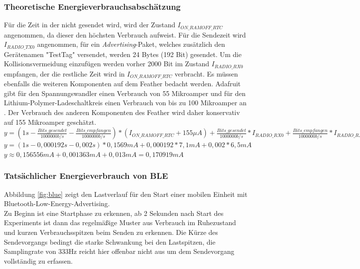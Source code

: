 \subsubsection{Theoretische Energieverbrauchsabschätzung}
Für die Zeit in der nicht gesendet wird, wird der Zustand $I_{ON\_RAMOFF\_RTC}$ angenommen, da dieser den höchsten Verbrauch aufweist.
Für die Sendezeit wird $I_{RADIO\_TX0}$ angenommen, für ein \emph{Advertising}-Paket, welches zusätzlich den Gerätenamen "{}TestTag"{} versendet, werden 24 Bytes (192 Bit) gesendet.
Um die Kollisionsvermeidung einzufügen werden vorher 2000 Bit im Zustand $I_{RADIO\_RX0}$ empfangen, der die restliche Zeit wird in $I_{ON\_RAMOFF\_RTC}$ verbracht. 
Es müssen ebenfalls die weiteren Komponenten auf dem Feather bedacht werden. 
Adafruit gibt für den Spannungswandler einen Verbrauch von 55 Mikroamper und für den Lithium-Polymer-Ladeschaltkreis einen Verbrauch von bis zu 100 Mikroamper an \cite{fried2016lora}. 
Der Verbrauch des anderen Komponenten des Feather wird daher konservativ auf 155 Mikroamper geschätzt.\\[1cm]

$y = (1s-\frac{Bits\_gesendet}{1000000 b/s} - \frac{Bits\_empfangen}{1000000 b/s}) * (I_{ON\_RAMOFF\_RTC} + 155 {\mu}A) + \frac{Bits\_gesendet}{1000000 b/s} * I_{RADIO\_RX0} + \frac{Bits\_empfangen}{1000000 b/s} * I_{RADIO\_RX0}$\\[0.5cm]
$y = (1s - 0,000192s - 0,002s) * 0,1569mA + 0,000192 * 7,1mA + 0,002 * 6,5mA$\\[0.5cm]
$y \approx 0,156556mA + 0,001363mA + 0,013mA = 0,170919mA$ \\[1cm]

\subsubsection{Tatsächlicher Energieverbrauch von BLE}
\label{ch:phase3:sec:powerble}
Abbildung \ref{fig:blue} zeigt den Lastverlauf für den Start einer mobilen Einheit mit Bluetooth-Low-Energy-Advertising.\\
Zu Beginn ist eine Startphase zu erkennen, ab 2 Sekunden nach Start des Experiments ist dann das regelmäßige Muster aus Verbrauch im Ruhezustand und kurzen Verbrauchsspitzen beim Senden zu erkennen.
Die Kürze des Sendevorgangs bedingt die starke Schwankung bei den Lastspitzen, die Samplingrate von 333Hz reicht hier offenbar nicht aus um dem Sendevorgang vollständig zu erfassen.\\

